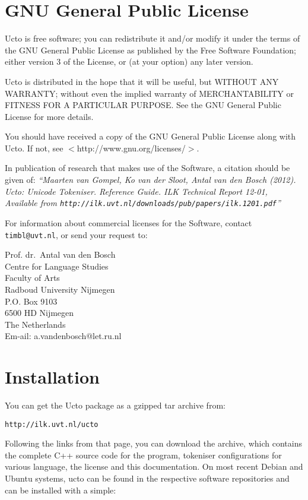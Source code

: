 \documentclass{report}
\begin{document}
\chapter{GNU General Public License}
\label{license}

Ucto is free software; you can redistribute it and/or modify it under the terms of the GNU General Public License as published by the Free
Software Foundation; either version 3 of the License, or (at your option) any later version.

Ucto is distributed in the hope that it will be useful, but WITHOUT ANY WARRANTY; without even the implied warranty of MERCHANTABILITY or FITNESS FOR A PARTICULAR PURPOSE.  See the GNU General Public License for more details.

You should have received a copy of the GNU General Public License along with Ucto.  If not, see $<$http://www.gnu.org/licenses/$>$.

In publication of research that makes use of the Software, a citation should be given of: {\em ``Maarten van Gompel, Ko van der Sloot, Antal van den Bosch (2012). Ucto: Unicode Tokeniser. Reference Guide. ILK Technical Report 12-01, \\ Available from {\tt http://ilk.uvt.nl/downloads/pub/papers/ilk.1201.pdf}''}

For information about commercial licenses for the Software, contact {\tt timbl@uvt.nl}, or send your request to:

Prof. dr.~Antal van den Bosch\\
Centre for Language Studies\\
Faculty of Arts \\
Radboud University Nijmegen \\
P.O. Box 9103 \\
6500 HD Nijmegen \\ 
The Netherlands \\
Em-ail: a.vandenbosch@let.ru.nl 

\pagestyle{headings}

\chapter{Installation}
\vspace{-1cm}


You can get the Ucto package as a gzipped tar archive from:

{\tt http://ilk.uvt.nl/ucto}

Following the links from that page, you can download the archive, which contains the complete C++ source code for the program, tokeniser configurations for various language, the license and this documentation. On most recent Debian and Ubuntu systems, ucto can be found in the respective software repositories and can be installed with a simple:
\end{document}

